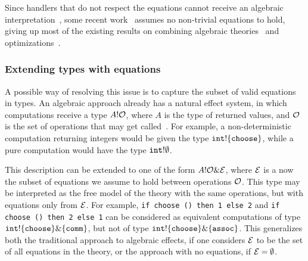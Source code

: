\documentclass[a4paper,UKenglish]{dagrep}
\begin{document}
Since handlers that do not respect the equations cannot receive an algebraic interpretation~\cite{DBLP:journals/corr/PlotkinP13}, some recent work~\cite{DBLP:journals/corr/BauerP13,DBLP:conf/icfp/KammarLO13} assumes no non-trivial equations to hold, giving up most of the existing results on combining algebraic theories~\cite{DBLP:journals/tcs/HylandPP06} and optimizations~\cite{DBLP:conf/popl/KammarP12}.

\subsubsection*{Extending types with equations}

A possible way of resolving this issue is to capture the subset of valid equations in types. An algebraic approach already has a natural effect system, in which computations receive a type $A ! \mathcal{O}$, where $A$ is the type of returned values, and $\mathcal{O}$ is the set of operations that may get called~\cite{DBLP:journals/corr/BauerP13,DBLP:conf/icfp/KammarLO13}. For example, a non-deterministic computation returning integers would be given the type $\mathtt{int} ! \{ \mathtt{choose} \}$, while a pure computation would have the type $\mathtt{int} ! \emptyset$.

This description can be extended to one of the form $A ! \mathcal{O} \& \mathcal{E}$, where $\mathcal{E}$ is a now the subset of equations we assume to hold between operations $\mathcal{O}$. This type may be interpreted as the free model of the theory with the same operations, but with equations only from $\mathcal{E}$. For example, \verb|if choose () then 1 else 2| and \verb|if choose () then 2 else 1| can be considered as equivalent computations of type $\mathtt{int} ! \{ \mathtt{choose} \} \& \{ \mathtt{comm} \}$, but not of type $\mathtt{int} ! \{ \mathtt{choose} \} \& \{ \mathtt{assoc} \}$. This generalizes both the traditional approach to algebraic effects, if one considers $\mathcal{E}$ to be the set of all equations in the theory, or the approach with no equations, if $\mathcal{E} = \emptyset$.
\end{document}
